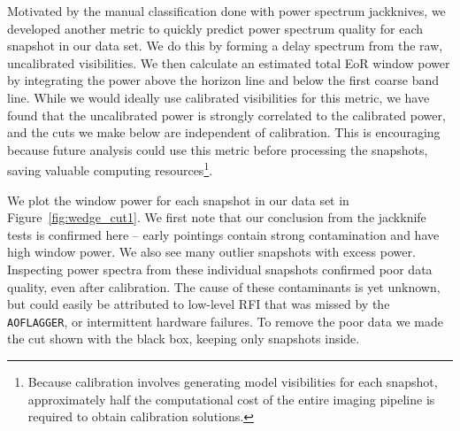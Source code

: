 \documentclass[iop]{emulateapj}
\begin{document}
Motivated by the manual classification done with power spectrum jackknives, we developed 
another metric to quickly predict power spectrum quality for each snapshot in our data set. 
We do this by forming a delay spectrum \citep{Parsons:2012b} from the raw, uncalibrated 
visibilities. We then calculate an estimated total EoR window power by integrating the 
power above the horizon line and below the first coarse band line. While we would ideally 
use calibrated visibilities for this metric, we have found that the uncalibrated power is 
strongly correlated to the calibrated power, and the cuts we make below are independent of 
calibration. This is encouraging because future analysis could use this metric before 
processing the snapshots, saving valuable computing resources\footnote{Because
calibration involves generating model visibilities for each snapshot, approximately half
the computational cost of the entire imaging pipeline is required to obtain 
calibration solutions.}.

We plot the window power for each snapshot in our data set in Figure~\ref{fig:wedge_cut1}. 
We first note that our conclusion from the jackknife tests is confirmed here -- early pointings 
contain strong contamination and have high window power. We also see many outlier 
snapshots with excess power. Inspecting power spectra from these individual snapshots 
confirmed poor data quality, even after calibration. The cause of these contaminants is yet 
unknown, but could easily be attributed to low-level RFI that was missed by the 
\texttt{AOFLAGGER}, or intermittent hardware failures. To remove the poor data we made 
the cut shown with the black box, keeping only snapshots inside.
\end{document}
